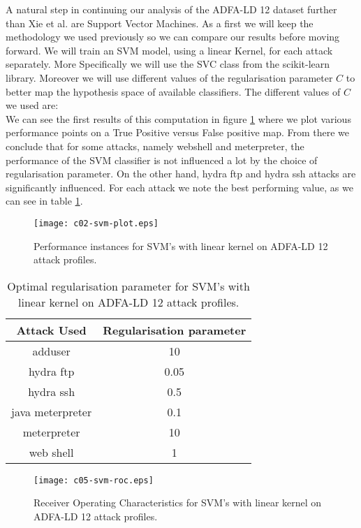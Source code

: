 \documentclass[reqno,openany,12pt]{amsbook}
\newcommand{\beqq}{\begin{equation*}}
\newcommand{\eeqq}{\end{equation*}}
\begin{document}
A natural step in continuing our analysis of the ADFA-LD 12 dataset further than Xie et al.\cite{adf1} are Support Vector Machines. As a first we will keep the methodology we used previously so we can compare our results before moving forward. We will train an SVM model, using a linear Kernel, for each attack separately. More Specifically we will use the SVC class from the scikit-learn library\cite{skl}. Moreover we will use different values of the regularisation parameter $C$ to better map the hypothesis space of available classifiers. The different values of $C$ we used are: 
\beqq
[0.05, 0.1, 0.5, 1, 5, 10, 50]
\eeqq
We can see the first results of this computation in figure \ref{svm-fr1} where we plot various performance points on a True Positive versus False positive map. From there we conclude that for some attacks, namely webshell and meterpreter, the performance of the SVM classifier is not influenced a lot by the choice of  regularisation parameter. On the other hand, hydra ftp and hydra ssh attacks are significantly influenced. For each attack we note the best performing value, as we can see in table \ref{svmt1}.


\begin{figure}
\texttt{[image: c02-svm-plot.eps]}
\caption{Performance instances for SVM's with linear kernel on ADFA-LD 12 attack profiles.}
\label{svm-fr1}
\end{figure}

\begin{table}
\begin{tabular}{|c|c|}
\hline
Attack Used &  Regularisation parameter \\ \hline 
adduser          & 10 \\ \hline
hydra ftp        & 0.05 \\ \hline
hydra ssh        & 0.5 \\ \hline
java meterpreter & 0.1 \\ \hline
meterpreter      & 10 \\ \hline
web shell        & 1 \\ \hline
\end{tabular}
\vspace{5pt}
\caption{Optimal regularisation parameter for SVM's with linear kernel on ADFA-LD 12 attack profiles.}
\label{svmt1}
\end{table}


\begin{figure}
\texttt{[image: c05-svm-roc.eps]}
\caption{Receiver Operating Characteristics for SVM's with linear kernel on ADFA-LD 12 attack profiles.}
\label{svm-fr2}
\end{figure}
\end{document}
